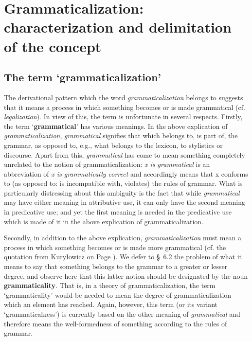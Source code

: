 \chapter{Grammaticalization: characterization and delimitation of the concept} \label{chap:2}

\section{The term ‘grammaticalization’} \label{sec:2.1}

The derivational pattern which the word \textit{grammaticalization} belongs to suggests that it means a process in which something becomes or is made grammatical (cf. \textit{legalization}). In view of this, the term is unfortunate in several respects. Firstly, the term ‘\textbf{grammatical}’ has various meanings. In the above explication of \textit{grammaticalization}, \textit{grammatical} signifies that which belongs to, is part of, the grammar, as opposed to, e.g., what belongs to the lexicon, to stylistics or discourse. Apart from this, \textit{grammatical} has come to mean something completely unrelated to the notion of grammaticalization: \textit{x is grammatical} is an abbreviation of \textit{x is grammatically correct} and accordingly means that x conforms to (as opposed to: is incompatible with, violates) the rules of grammar. What is particularly distressing about this ambiguity is the fact that while \textit{grammatical} may have either meaning in attributive use, it can only have the second meaning in predicative use; and yet the first meaning is needed in the predicative use which is made of it in the above explication of grammaticalization.

Secondly, in addition to the above explication, \textit{grammaticalization} must mean a process in which something becomes or is made  more grammatical (cf. the quotation from Kuryłowicz on Page \pageref{quote:kurylowciz}). We defer to §~6.2 the problem of what it means to say that something belongs to the grammar to a greater or lesser degree, and observe here that this latter notion should be designated by the noun \textbf{grammaticality}. That is, in a theory of grammaticalization, the term ‘grammaticality’ would be needed to mean the degree of grammaticalization which an element has reached. Again, however, this term (or its variant ‘grammaticalness’) is currently based on the other meaning of \textit{grammatical} and therefore means the well-formedness of something according to the rules of grammar.

